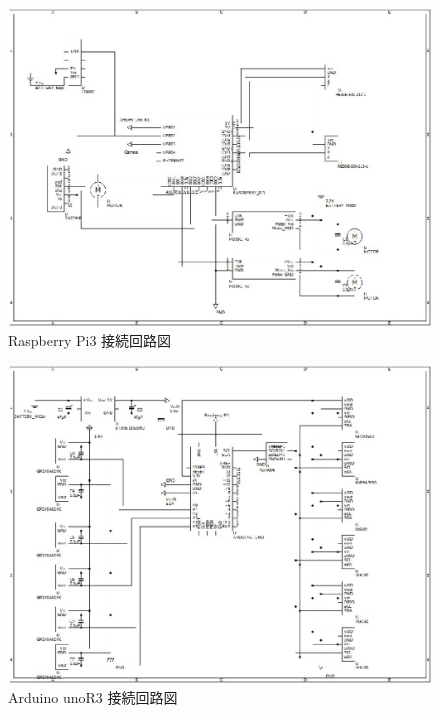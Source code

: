 \documentclass[10pt,a4j]{jarticle}
\begin{document}
\newpage
\begin{figure}[t]
 \centering
 \includegraphics[width=0.9\hsize]{../Circuit/picture/RCR_raspberryPi3.eps}
    \caption{Raspberry Pi3 接続回路図}
    \label{c_raspberry}
\end{figure}
\begin{figure}[b]
 \centering
 \includegraphics[width=0.9\hsize]{../Circuit/picture/RCR_arduino.eps}
    \caption{Arduino unoR3 接続回路図}
    \label{c_arduino}
\end{figure}
\end{document}
